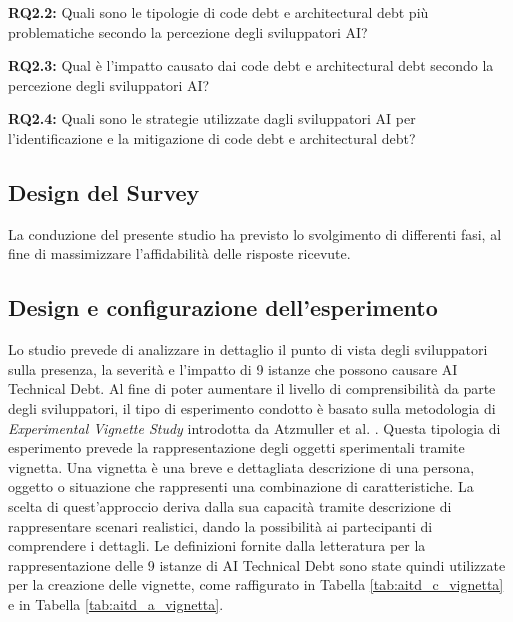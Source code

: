 \begin{rqbox}
\textbf{RQ2.2:} Quali sono le tipologie di code debt e architectural debt più problematiche secondo la percezione degli sviluppatori AI?
\end{rqbox}


\begin{rqbox}
\textbf{RQ2.3:} Qual è l'impatto causato dai code debt e architectural debt secondo la percezione degli sviluppatori AI?
\end{rqbox}

\begin{rqbox}
\textbf{RQ2.4:} Quali sono le strategie utilizzate dagli sviluppatori AI per l'identificazione e la mitigazione di code debt e architectural debt?
\end{rqbox}





\subsection{Design del Survey}
La conduzione del presente studio ha previsto lo svolgimento di differenti fasi, al fine di massimizzare l'affidabilità delle risposte ricevute.


\subsection{Design e configurazione dell'esperimento}
Lo studio prevede di analizzare in dettaglio il punto di vista degli sviluppatori sulla presenza, la severità e l'impatto di 9 istanze che possono causare AI Technical Debt.
Al fine di poter aumentare il livello di comprensibilità da parte degli sviluppatori, il tipo di esperimento condotto è basato sulla metodologia di \textit{Experimental Vignette Study} introdotta da Atzmuller et al. \cite{AtzmullerVignetta}. Questa tipologia di esperimento prevede la rappresentazione degli oggetti sperimentali tramite vignetta.
Una vignetta è una breve e dettagliata descrizione di una persona, oggetto o situazione che rappresenti una combinazione di caratteristiche.
La scelta di quest'approccio deriva dalla sua capacità tramite descrizione di rappresentare scenari realistici, dando la possibilità ai partecipanti di comprendere i dettagli.
Le definizioni fornite dalla letteratura per la rappresentazione delle 9 istanze di AI Technical Debt sono state quindi utilizzate per la creazione delle vignette, come raffigurato in Tabella \ref{tab:aitd_c_vignetta} e in Tabella \ref{tab:aitd_a_vignetta}.

